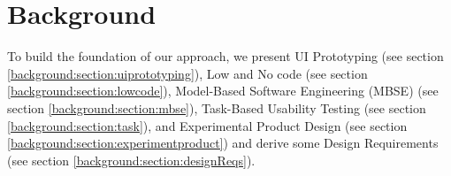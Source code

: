
\chapter{Background}
\ifpdf
    \graphicspath{{Chapters/Background/Figs/}{Chapters/Background/Figs/}{Chapters/Background/Figs/}}
\else
    \graphicspath{{Chapters/Background/Figs/}{Chapters/Background/Figs/}}
\fi
To build the foundation of our approach, we present UI Prototyping (see section \ref{background:section:uiprototyping}), Low and No code (see section \ref{background:section:lowcode}), Model-Based Software Engineering (MBSE) (see section \ref{background:section:mbse}), Task-Based Usability Testing (see section \ref{background:section:task}), and Experimental Product Design (see section \ref{background:section:experimentproduct}) and derive some Design Requirements (see section \ref{background:section:designReqs}).

